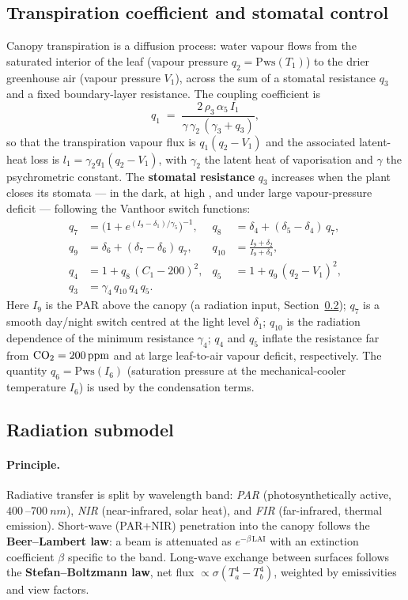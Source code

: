 \documentclass[11pt,a4paper]{article}
\newcommand{\Tcan}{T_{1}}
\newcommand{\Cair}{C_{1}}
\newcommand{\Vair}{V_{1}}
\begin{document}
\subsection{Transpiration coefficient and stomatal control}\label{sec:transp}
Canopy transpiration is a diffusion process: water vapour flows from the saturated interior of the
leaf (vapour pressure $q_2=\mathrm{Pws}(\Tcan)$) to the drier greenhouse air (vapour pressure
$\Vair$), across the sum of a stomatal resistance $q_3$ and a fixed boundary-layer resistance. The
coupling coefficient is
\begin{equation}
  q_1 \;=\; \frac{2\,\rho_3\,\alpha_5\,I_1}{\gamma\,\gamma_2\,(\gamma_3 + q_3)},
\end{equation}
so that the transpiration vapour flux is $q_1(q_2-\Vair)$ and the associated latent-heat loss is
$l_1=\gamma_2 q_1 (q_2-\Vair)$, with $\gamma_2$ the latent heat of vaporisation and $\gamma$ the
psychrometric constant. The \textbf{stomatal resistance} $q_3$ increases when the plant closes its
stomata --- in the dark, at high , and under large vapour-pressure deficit --- following the
Vanthoor switch functions:
\begin{align}
  q_7 &= \big(1 + e^{(I_9-\delta_1)/\gamma_5}\big)^{-1}, &
  q_8 &= \delta_4 + (\delta_5-\delta_4)\,q_7, \\
  q_9 &= \delta_6 + (\delta_7-\delta_6)\,q_7, &
  q_{10} &= \frac{I_9+\delta_2}{I_9+\delta_3}, \\
  q_4 &= 1 + q_8\,(\Cair-200)^2, &
  q_5 &= 1 + q_9\,(q_2-\Vair)^2, \\
  q_3 &= \gamma_4\, q_{10}\, q_4\, q_5. &&
\end{align}
Here $I_9$ is the PAR above the canopy (a radiation input, Section~\ref{sec:rad}); $q_7$ is a smooth
day/night switch centred at the light level $\delta_1$; $q_{10}$ is the radiation dependence of the
minimum resistance $\gamma_4$; $q_4$ and $q_5$ inflate the resistance far from
$\ce{CO2}=\SI{200}{ppm}$ and at large leaf-to-air vapour deficit, respectively. The quantity
$q_6=\mathrm{Pws}(I_6)$ (saturation pressure at the mechanical-cooler temperature $I_6$) is used by
the condensation terms.

\subsection{Radiation submodel}\label{sec:rad}
\paragraph{Principle.} Radiative transfer is split by wavelength band: \emph{PAR}
(photosynthetically active, $\SI{400}{}$--$\SI{700}{nm}$), \emph{NIR} (near-infrared, solar heat),
and \emph{FIR} (far-infrared, thermal emission). Short-wave (PAR+NIR) penetration into the canopy
follows the \textbf{Beer--Lambert law}: a beam is attenuated as $e^{-\beta\,\mathrm{LAI}}$ with an
extinction coefficient $\beta$ specific to the band. Long-wave exchange between surfaces follows the
\textbf{Stefan--Boltzmann law}, net flux $\propto \sigma(T_a^4-T_b^4)$, weighted by emissivities and
view factors.
\end{document}
